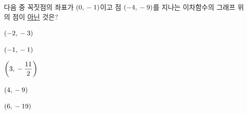 다음 중 꼭짓점의 좌표가 $(0{,}\mkern3mu -1)$이고 점 $(-4{,}\mkern3mu -9)$를 지나는 이차함수의 그래프 위의 점이 \underline{아닌} 것은?
\begin{choices32}{\rule[-3ex]{0pt}{8ex}$(-2{,}\mkern3mu -3)$}{\rule[-3ex]{0pt}{8ex}$(-1{,}\mkern3mu -1)$}{\rule[-3ex]{0pt}{8ex}$\left(3{,}\mkern3mu -\dfrac{11}{2}\right)$}{\rule[-3ex]{0pt}{8ex}$(4{,}\mkern3mu -9)$}{\rule[-3ex]{0pt}{8ex}$(6{,}\mkern3mu -19)$}\end{choices32}
